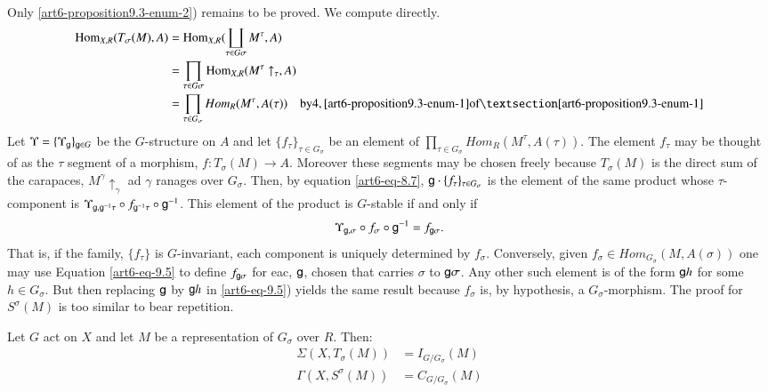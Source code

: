 Only \ref{art6-proposition9.3-enum-2}) remains to be proved. We compute directly.
\begin{align*}
\Hom_{X, R}(T_{\sigma}(M), A) &= \Hom_{X, R}(\coprod_{\tau \in G{\sigma}} M^{\tau}, A)\\
& = \prod_{\tau \in G\sigma}\Hom_{X, R}(M^{\tau} \uparrow_{\tau}, A)\\
& = \prod_{\tau \in G_{\sigma}} Hom_{R}(M^{\tau}, A(\tau)) \quad \text{by} 4, \eqref{art6-proposition9.3-enum-1} \text{of} \textsection \ref{art6-proposition9.3-enum-1}
\end{align*}
Let $\Upsilon = \{\Upsilon_{\mathsf{g}}\}_{\mathsf{g} \in G}$ be the $G$-structure on $A$ and let $\{f_{\tau}\}_{\tau \in G_{\sigma}}$
be an element of $\prod_{\tau \in G_{\sigma}}Hom_{R}(M^{\tau}, A(\tau))$. The element $f_{\tau}$ may be thought of as the $\tau$ segment of a morphism, $f: T_{\sigma}(M)\rightarrow A$. Moreover these segments may be chosen freely because $T_{\sigma}(M)$ is the direct sum of the carapaces, $M^{\gamma}\uparrow_{\gamma}$ ad $\gamma$ ranages over $G_{\sigma}$. Then, by equation \ref{art6-eq-8.7}, $\mathsf{g} \cdot\{f_{\tau}\}_{\tau\in G_{\sigma}}$ is the element of the same product whose $\tau$-component is $\Upsilon_{\mathsf{g}, \mathsf{g}^{-1}\tau} \circ f_{\mathsf{g}^{-1}\tau} \circ \mathsf{g}^{-1}$. This element of the product is $G$-stable if and only if
\begin{equation}\label{art6-eq-9.5}
\Upsilon_{\mathsf{g}, \sigma} \circ f_{\sigma} \circ \mathsf{g}^{-1} = f_{\mathsf{g} \sigma}.
\end{equation}
That is, if the family, $\{f_{\tau}\}$ is $G$-invariant, each component is uniquely determined by $f_{\sigma}$. Conversely, given $f_{\sigma} \in  Hom_{G_{\sigma}}(M , A(\sigma))$ one may use Equation \ref{art6-eq-9.5} to define $f_{\mathsf{g} \sigma}$ for eac, $\mathsf{g}$, chosen that carries $\sigma$ to $\mathsf{g}\sigma$. Any other such element is of the form $\mathsf{g} h$ for some $h \in G_{\sigma}$. But then replacing $\mathsf{g}$ by $\mathsf{g} h$ in \ref{art6-eq-9.5}) yields the same result because $f_{\sigma}$ is, by hypothesis, a $G_{\sigma}$-morphism. The proof for $S^{\sigma}(M)$ is too similar to bear repetition.

\begin{prop}\label{art6-prop-9.6}
Let $G$ act on $X$ and let $M$ be a representation of $G_{\sigma}$ over $R$. Then:
\begin{align*}
\Sigma(X, T_{\sigma}(M)) &= I_{G/G_{\sigma}}(M)\\
\Gamma(X, S^{\sigma}(M)) &= C_{G/G_{\sigma}}(M)
\end{align*}
\end{prop}

